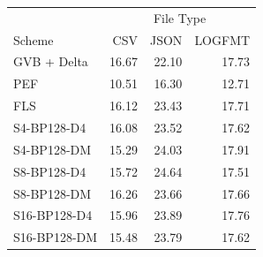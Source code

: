 \begin{tabular}{lrrr}
\toprule
 & \multicolumn{3}{c}{File Type} \\
Scheme & CSV & JSON & LOGFMT \\
\midrule
GVB + Delta & 16.67 & 22.10 & 17.73 \\
PEF & 10.51 & 16.30 & 12.71 \\
FLS & 16.12 & 23.43 & 17.71 \\
S4-BP128-D4 & 16.08 & 23.52 & 17.62 \\
S4-BP128-DM & 15.29 & 24.03 & 17.91 \\
S8-BP128-D4 & 15.72 & 24.64 & 17.51 \\
S8-BP128-DM & 16.26 & 23.66 & 17.66 \\
S16-BP128-D4 & 15.96 & 23.89 & 17.76 \\
S16-BP128-DM & 15.48 & 23.79 & 17.62 \\
\bottomrule
\end{tabular}
